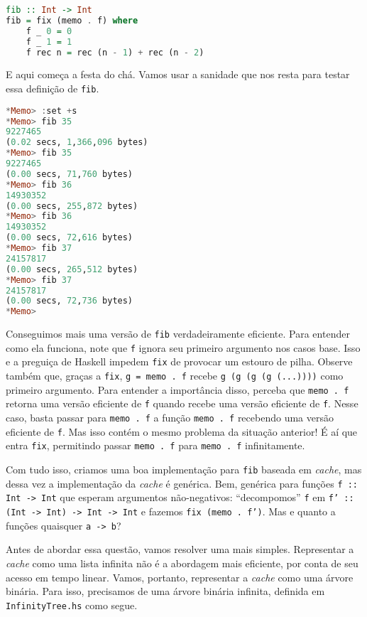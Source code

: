 \documentclass[a4paper]{article}
\begin{document}
\begin{lstlisting}[language=haskell, frame=single]
fib :: Int -> Int
fib = fix (memo . f) where
	f _ 0 = 0
	f _ 1 = 1
	f rec n = rec (n - 1) + rec (n - 2)
\end{lstlisting}

E aqui começa a festa do chá.
Vamos usar a sanidade que nos resta para testar essa definição de \texttt{fib}.

\begin{lstlisting}[language=haskell, frame=single]
*Memo> :set +s
*Memo> fib 35
9227465
(0.02 secs, 1,366,096 bytes)
*Memo> fib 35
9227465
(0.00 secs, 71,760 bytes)
*Memo> fib 36
14930352
(0.00 secs, 255,872 bytes)
*Memo> fib 36
14930352
(0.00 secs, 72,616 bytes)
*Memo> fib 37
24157817
(0.00 secs, 265,512 bytes)
*Memo> fib 37
24157817
(0.00 secs, 72,736 bytes)
*Memo>
\end{lstlisting}

Conseguimos mais uma versão de \texttt{fib} verdadeiramente eficiente.
Para entender como ela funciona, note que \texttt{f} ignora seu primeiro argumento nos casos base.
Isso e a preguiça de Haskell impedem \texttt{fix} de provocar um estouro de pilha.
Observe também que, graças a \texttt{fix}, \mbox{\texttt{g = memo . f}} recebe \texttt{g (g (g (g (...))))} como primeiro argumento.
Para entender a importância disso, perceba que \texttt{memo . f} retorna uma versão eficiente de \texttt{f} quando recebe uma versão eficiente de \texttt{f}.
Nesse caso, basta passar para \texttt{memo . f} a função \texttt{memo . f} recebendo uma versão eficiente de \texttt{f}.
Mas isso contém o mesmo problema da situação anterior!
É aí que entra \texttt{fix}, permitindo passar \texttt{memo . f} para \texttt{memo . f} infinitamente.

Com tudo isso, criamos uma boa implementação para \texttt{fib} baseada em \emph{cache}, mas dessa vez a implementação da \emph{cache} é genérica.
Bem, genérica para funções \texttt{f :: Int -> Int} que esperam argumentos não-negativos: ``decompomos'' \texttt{f} em \mbox{\texttt{f' :: (Int -> Int) -> Int -> Int}} e fazemos \texttt{fix (memo . f')}.
Mas e quanto a funções quaisquer \texttt{a -> b}?

Antes de abordar essa questão, vamos resolver uma mais simples.
Representar a \emph{cache} como uma lista infinita não é a abordagem mais eficiente, por conta de seu acesso em tempo linear.
Vamos, portanto, representar a \emph{cache} como uma árvore binária.
Para isso, precisamos de uma árvore binária infinita, definida em \texttt{InfinityTree.hs} como segue.
\end{document}
